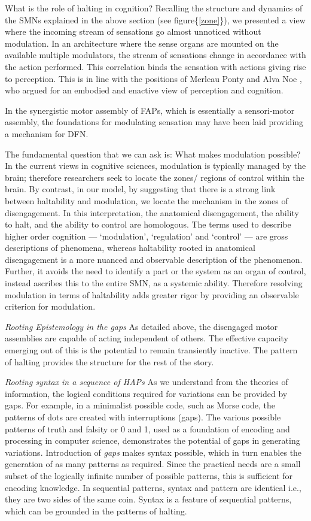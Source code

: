 What is the role of halting in cognition?
Recalling the structure and dynamics of the SMNs explained in the above section (see figure\{\ref{zone}\}), we presented a view where the incoming stream of sensations go almost unnoticed without modulation. In an architecture where the sense organs are mounted on the available multiple modulators, the stream of sensations change in accordance with the action performed. This correlation binds the sensation with actions giving rise to perception. This is in line with the positions of Merleau Ponty \cite{ponty1969phenomenology} and Alva Noe \cite{noe_action_2004}, who argued for an embodied and enactive view of perception and cognition. 

In the synergistic motor assembly of FAPs, which is essentially a sensori-motor assembly, the foundations for modulating sensation may have been laid providing a mechanism for DFN. 

The fundamental question that we can ask is: What makes modulation possible? In the current views in cognitive sciences, modulation is typically managed by the brain; therefore researchers seek to locate the zones/ regions of control within the brain. By contrast, in our model, by suggesting that there is a strong link between haltability and modulation, we locate the mechanism in the zones of disengagement. In this interpretation, the anatomical disengagement, the ability to halt, and the ability to control are homologous. The terms used to describe higher order cognition --- `modulation', `regulation' and `control' --- are gross descriptions of phenomena, whereas haltability rooted in anatomical disengagement is a more nuanced and observable description of the phenomenon. Further, it avoids the need to identify a part or the system as an organ of control, instead ascribes this to the entire SMN, as a systemic ability. Therefore resolving modulation in terms of haltability adds greater rigor by providing an observable criterion for modulation. 

\emph{Rooting Epistemology in the gaps} As detailed above, the disengaged motor assemblies are capable of acting independent of others. The effective capacity emerging out of this is the potential to remain transiently inactive. The pattern of halting provides the structure for the rest of the story. 

\emph{Rooting syntax in a sequence of HAPs} As we understand from the theories of information, the logical conditions required for variations can be provided by gaps. For example, in a minimalist possible code, such as Morse code, the patterns of dots are created with interruptions (gaps). The various possible patterns of truth and falsity or 0 and 1, used as a foundation of encoding and processing in computer science, demonstrates the potential of gaps in generating variations. Introduction of \textit{gaps} makes syntax possible, which in turn enables the generation of as many patterns as required. Since the practical needs are a small subset of the logically infinite number of possible patterns, this is sufficient for encoding knowledge. In sequential patterns, syntax and pattern are identical i.e., they are two sides of the same coin. Syntax is a feature of sequential patterns, which can be grounded in the patterns of halting. 

